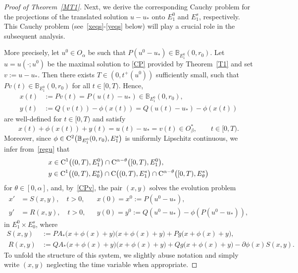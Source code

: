 \documentclass[reqno,11pt]{amsart}
\numberwithin{equation}{section}
\theoremstyle{remark}
\begin{document}
\begin{proof}[Proof of Theorem~\ref{MT1}]
Next, we derive the corresponding Cauchy problem for the projections of the translated solution $u - u_*$ onto $E_1^0$ and  $E_1^s$, respectively. 
This Cauchy problem (see~\eqref{xeqs}-\eqref{yeqs} below) will play a crucial role in the subsequent analysis.

More precisely, let $u^0 \in O_\alpha$ be such that $P(u^0 - u_*) \in \mathbb{B}_{E_1^0}(0,r_0)$.
Let $u = u(\cdot;u^0)$ be the maximal solution to \eqref{CP} provided by Theorem~\ref{T1} and set $v := u - u_*$. 
Then there exists $T \in (0,t^+(u^0))$ sufficiently small, such that
$Pv(t) \in \mathbb{B}_{E_1^0}(0,r_0)$ for all  $t \in [0,T).$
 Hence, 
\begin{equation}\label{defxy}
\begin{aligned}
x(t)&:=Pv(t)=P(u(t)-u_*) \in \mathbb{B}_{E_1^0}(0,r_0),\\
y(t)&:=Q(v(t))-\phi(x(t))=Q(u(t)-u_*)-\phi(x(t))
\end{aligned}
\end{equation}
are well-defined for $ t\in[0,T)$ and satisfy
\[
x(t)+\phi(x(t))+y(t)=u(t)-u_*=v(t)\in O_\beta^*,\qquad t\in[0,T).
\]
 Moreover, since $\phi\in {\rm C}^{2}\big(\mathbb{B}_{E_1^0}(0,r_0),E_1^s\big)$ is uniformly Lipschitz continuous, we  infer from~\eqref{regu} that 
\begin{equation}\label{regxy}
\begin{aligned} 
&x\in {\rm C}^1\big((0,T),E_1^0\big)\cap  {\rm C}^{\alpha-\theta} \big([0,T),E_1^0\big),\\
&y\in {\rm C}^1\big((0,T),E_0^s\big)\cap {\rm C}\big((0,T),E_1^s\big)\cap  {\rm C}^{\alpha-\theta}\big([0,T),E_\theta^s\big)
\end{aligned}
\end{equation}
for $\theta\in[0,\alpha]$, and, by~\eqref{CPv}, the pair $(x,y)$ solves the evolution problem
\begin{align*}
x'&=S(x,y), \quad t>0,   && x(0)=x^0:= P(u^0-u_*),\\
y'&=R(x,y), \quad   t>0, && y(0)=y^0:=Q(u^0-u_*)-\phi(P(u^0-u_*)),
\end{align*}
in $E_1^0\times E_0^s$, where
\begin{align*}
S(x,y)&:=PA_*\big(x+\phi(x)+y\big)\big(x+\phi(x)+y\big)+Pg\big(x+\phi(x)+y\big), \\\
R(x,y)&:=QA_*\big(x+\phi(x)+y\big)\big(x+\phi(x)+y\big)+Qg\big(x+\phi(x)+y\big)-\partial\phi(x) S(x,y).
\end{align*}
To unfold the structure of this system, we  slightly abuse notation and simply write $(x,y)$ neglecting the time variable when appropriate. 

\end{proof}
\end{document}
